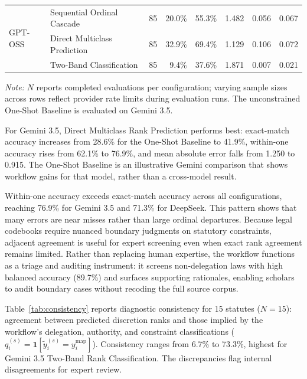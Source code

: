 \documentclass[runningheads]{llncs}
\begin{document}
\begin{table}[t]
\begin{threeparttable}
\begin{tabular}{@{}llrrrrrr@{}}
\multirow{3}{*}{GPT-OSS} 
  & Sequential Ordinal Cascade        & 85 & 20.0\% & 55.3\% & 1.482 & 0.056 & 0.067 \\
  & Direct Multiclass Prediction      & 85 & 32.9\% & 69.4\% & 1.129 & 0.106 & 0.072 \\
  & Two-Band Classification           & 85 & 9.4\%  & 37.6\% & 1.871 & 0.007 & 0.021 \\
\bottomrule
\end{tabular}

\begin{tablenotes}
\scriptsize
\vspace{3mm}
\item[] \textit{Note:} $N$ reports completed evaluations per configuration; varying sample sizes across rows reflect provider rate limits during evaluation runs. The unconstrained One-Shot Baseline is evaluated on Gemini 3.5.
\end{tablenotes}

\end{threeparttable}
\end{table}

For Gemini 3.5, Direct Multiclass Rank Prediction performs best: exact-match accuracy increases from 28.6\% for the One-Shot Baseline to 41.9\%, within-one accuracy rises from 62.1\% to 76.9\%, and mean absolute error falls from 1.250 to 0.915. The One-Shot Baseline is an illustrative Gemini comparison that shows workflow gains for that model, rather than a cross-model result.

Within-one accuracy exceeds exact-match accuracy across all configurations, reaching 76.9\% for Gemini 3.5 and 71.3\% for DeepSeek. This pattern shows that many errors are near misses rather than large ordinal departures. Because legal codebooks require nuanced boundary judgments on statutory constraints, adjacent agreement is useful for expert screening even when exact rank agreement remains limited. Rather than replacing human expertise, the workflow functions as a triage and auditing instrument: it screens non-delegation laws with high balanced accuracy (89.7\%) and surfaces supporting rationales, enabling scholars to audit boundary cases without recoding the full source corpus.

Table~\ref{tab:consistency} reports diagnostic consistency for 15 statutes ($N=15$): agreement between predicted discretion ranks and those implied by the workflow's delegation, authority, and constraint classifications ($q_i^{(s)} = \mathbf{1}[\tilde y_i^{(s)} = y_i^{\mathrm{map}}]$). Consistency ranges from 6.7\% to 73.3\%, highest for Gemini 3.5 Two-Band Rank Classification. The discrepancies flag internal disagreements for expert review.
\end{document}
